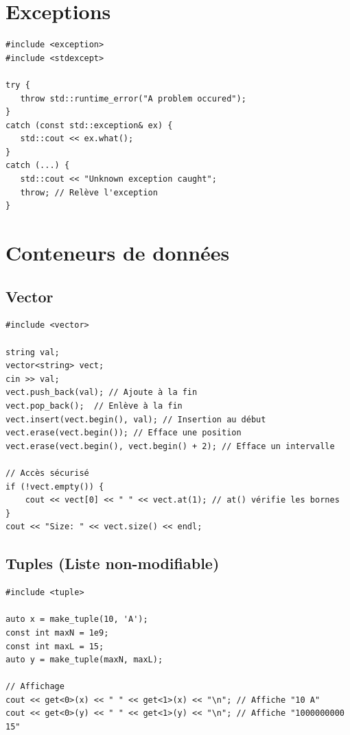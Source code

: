 \documentclass{article}
\begin{document}
\begin{multicols*}{3}
\begin{lstlisting}
\end{lstlisting}

    \section*{Exceptions}

    \begin{lstlisting}
#include <exception>
#include <stdexcept>

try {
   throw std::runtime_error("A problem occured");
}
catch (const std::exception& ex) {
   std::cout << ex.what();
}
catch (...) {
   std::cout << "Unknown exception caught";
   throw; // Relève l'exception
}
\end{lstlisting}

    \section*{Conteneurs de données}

    \subsection*{Vector}

    \begin{lstlisting}
#include <vector>

string val;
vector<string> vect;
cin >> val;
vect.push_back(val); // Ajoute à la fin
vect.pop_back();  // Enlève à la fin
vect.insert(vect.begin(), val); // Insertion au début
vect.erase(vect.begin()); // Efface une position
vect.erase(vect.begin(), vect.begin() + 2); // Efface un intervalle

// Accès sécurisé
if (!vect.empty()) {
    cout << vect[0] << " " << vect.at(1); // at() vérifie les bornes
}
cout << "Size: " << vect.size() << endl;

\end{lstlisting}

    \subsection*{Tuples (Liste non-modifiable)}

    \begin{lstlisting}
#include <tuple>

auto x = make_tuple(10, 'A');
const int maxN = 1e9;
const int maxL = 15;
auto y = make_tuple(maxN, maxL);

// Affichage
cout << get<0>(x) << " " << get<1>(x) << "\n"; // Affiche "10 A"
cout << get<0>(y) << " " << get<1>(y) << "\n"; // Affiche "1000000000 15"


\end{lstlisting}
\end{multicols*}
\end{document}

